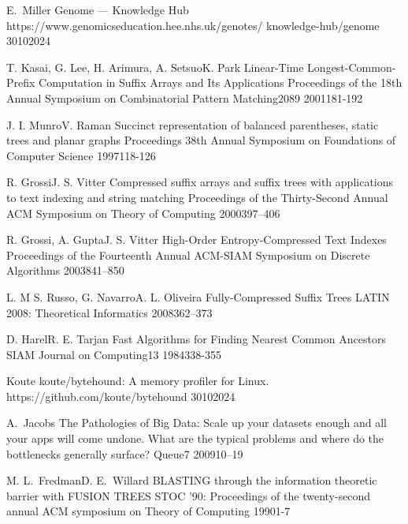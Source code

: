 \spletniVirZAvtorjem
    {E.~Miller}
    {Genome — Knowledge Hub}
    {\newline https://www.genomicseducation.hee.nhs.uk/genotes/ knowledge-hub/genome}
    {30}{10}{2024}

\clanekVRevijiVecAvtorjev
    {T. Kasai, G. Lee, H. Arimura, A. Setsuo}{K. Park}
    {Linear-Time Longest-Common-Prefix Computation in Suffix Arrays and Its Applications}
    {Proceedings of the 18th Annual Symposium on Combinatorial Pattern Matching}{2089}
    {2001}{181-192}

\clanekVRevijiVecAvtorjev
    {J. I. Munro}{V. Raman}
    {Succinct representation of balanced parentheses, static trees and planar graphs}
    {Proceedings 38th Annual Symposium on Foundations of Computer Science}{}
    {1997}{118-126}

\clanekVRevijiVecAvtorjev
    {R. Grossi}{J. S. Vitter}
    {Compressed suffix arrays and suffix trees with applications to text indexing and string matching }
    {Proceedings of the Thirty-Second Annual ACM Symposium on Theory of Computing}{}
    {2000}{397–406}

\clanekVRevijiVecAvtorjev
    {R. Grossi, A. Gupta}{J. S. Vitter}
    {High-Order Entropy-Compressed Text Indexes }
    {Proceedings of the Fourteenth Annual ACM-SIAM Symposium on Discrete Algorithms}{}
    {2003}{841–850}

\clanekVRevijiVecAvtorjev
    {L. M S. Russo, G. Navarro}{A. L. Oliveira}
    {Fully-Compressed Suffix Trees}
    {LATIN 2008: Theoretical Informatics}{}
    {2008}{362--373}

\clanekVRevijiVecAvtorjev
    {D. Harel}{R. E. Tarjan}
    {Fast Algorithms for Finding Nearest Common Ancestors}
    {SIAM Journal on Computing}{13}
    {1984}{338-355}

\spletniVirZAvtorjem
    {Koute}
    {koute/bytehound: A memory profiler for Linux.}
    {https://github.com/koute/bytehound}
    {30}{10}{2024}

\clanekVRevijiEnAvtor
    {A.~Jacobs}
    {The Pathologies of Big Data: Scale up your datasets enough and all your apps will come undone. What are the typical problems and where do the bottlenecks generally surface?}
    {Queue}{7}
    {2009}{10--19}
    
\konferencniClanekVecAvtorjev
    {M. L.~Fredman}{D. E.~Willard}
    {BLASTING through the information theoretic barrier with FUSION TREES}
    {STOC '90: Proceedings of the twenty-second annual ACM symposium on Theory of Computing}
    {1990}{1-7}

